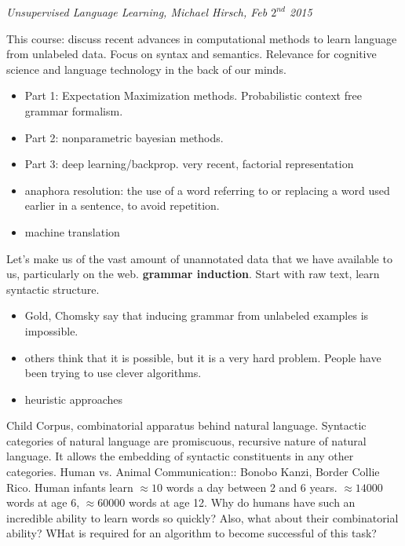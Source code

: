 \documentclass[]{article}
\begin{document}
\begin{flushright}
	\textit{Unsupervised Language Learning, Michael Hirsch, Feb $2^{nd}$ 2015}
\end{flushright}

This course: discuss recent advances in computational methods to learn language from unlabeled data. Focus on syntax and semantics. Relevance for cognitive science and language technology in the back of our minds. 

\begin{itemize}
	\item Part 1: Expectation Maximization methods. Probabilistic context free grammar formalism.
	\item Part 2: nonparametric bayesian methods. 
	\item Part 3: deep learning/backprop. very recent, factorial representation
	\item anaphora resolution: the use of a word referring to or replacing a word used earlier in a sentence, to avoid repetition.
	\item machine translation
\end{itemize}

Let's make us of the vast amount of unannotated data that we have available to us, particularly on the web. \textbf{grammar induction}.
Start with raw text, learn syntactic structure. 

\begin{itemize}
	\item Gold, Chomsky say that inducing grammar from unlabeled examples is impossible.
	\item others think that it is possible, but it is a very hard problem. People have been trying to use clever algorithms.
	\item heuristic approaches
\end{itemize}

Child Corpus, combinatorial apparatus behind natural language.
Syntactic categories of natural language are promiscuous, recursive nature of natural language. It allows the embedding of syntactic constituents in any other categories.
Human vs. Animal Communication:: Bonobo Kanzi, Border Collie Rico. Human infants learn $\approx 10$ words a day between 2 and 6 years. $\approx 14000$ words at age 6, $\approx 60000$ words at age 12. Why do humans have such an incredible ability to learn words so quickly? Also, what about their combinatorial ability? WHat is required for an algorithm to become successful of this task?
\end{document}
